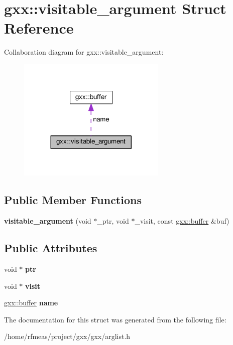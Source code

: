 \hypertarget{structgxx_1_1visitable__argument}{}\section{gxx\+:\+:visitable\+\_\+argument Struct Reference}
\label{structgxx_1_1visitable__argument}


Collaboration diagram for gxx\+:\+:visitable\+\_\+argument\+:\nopagebreak
\begin{figure}[H]
\begin{center}
\leavevmode
\includegraphics[width=200pt]{structgxx_1_1visitable__argument__coll__graph}
\end{center}
\end{figure}
\subsection*{Public Member Functions}
\begin{DoxyCompactItemize}
\item 
{\bfseries visitable\+\_\+argument} (void $\ast$\+\_\+ptr, void $\ast$\+\_\+visit, const \hyperlink{classgxx_1_1buffer}{gxx\+::buffer} \&buf)\hypertarget{structgxx_1_1visitable__argument_a9e7821f1ad51334763eec9e63ef6470d}{}\label{structgxx_1_1visitable__argument_a9e7821f1ad51334763eec9e63ef6470d}

\end{DoxyCompactItemize}
\subsection*{Public Attributes}
\begin{DoxyCompactItemize}
\item 
void $\ast$ {\bfseries ptr}\hypertarget{structgxx_1_1visitable__argument_a4a712de18b0a779cc42b9dd4d7ed7cf8}{}\label{structgxx_1_1visitable__argument_a4a712de18b0a779cc42b9dd4d7ed7cf8}

\item 
void $\ast$ {\bfseries visit}\hypertarget{structgxx_1_1visitable__argument_a4df4264ff978f557552c4361bba2604a}{}\label{structgxx_1_1visitable__argument_a4df4264ff978f557552c4361bba2604a}

\item 
\hyperlink{classgxx_1_1buffer}{gxx\+::buffer} {\bfseries name}\hypertarget{structgxx_1_1visitable__argument_af35ecfdefa214d2ab3e55612321a2d39}{}\label{structgxx_1_1visitable__argument_af35ecfdefa214d2ab3e55612321a2d39}

\end{DoxyCompactItemize}


The documentation for this struct was generated from the following file\+:\begin{DoxyCompactItemize}
\item 
/home/rfmeas/project/gxx/gxx/arglist.\+h\end{DoxyCompactItemize}
